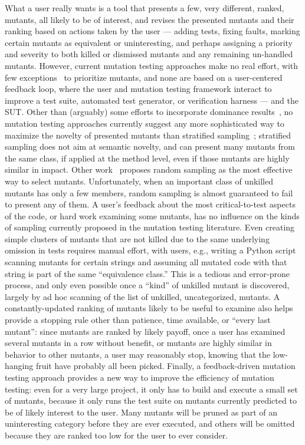 What a user really wants is a tool that presents a few, very different, ranked, mutants, all likely to be of interest, and revises the presented mutants and their ranking based on actions taken by the user --- adding tests, fixing faults, marking certain mutants as equivalent or uninteresting, and perhaps assigning a priority and severity to both killed or dismissed mutants and any remaining un-handled mutants. However, current mutation testing approaches make no real effort, with few exceptions~\cite{MutGoogle,FaRM} to prioritize mutants, and none are based on a user-centered feedback loop, where the user and mutation testing framework interact to improve a test suite, automated test generator, or verification harness --- and the SUT.  Other than (arguably) some efforts to incorporate dominance results~\cite{MutQuality}, no mutation testing approaches currently suggest any more sophisticated way to maximize the novelty of presented mutants than stratified sampling~\cite{gopinath2017mutation}; stratified sampling does not aim at semantic novelty, and can present many mutants from the same class, if applied at the method level, even if those mutants are highly similar in impact.  Other work~\cite{gopinath2015howhard} proposes random sampling as the most effective way to select mutants.  Unfortunately, when an important class of unkilled mutants has only a few members, random sampling is almost guaranteed to fail to present any of them.  A user's feedback about the most critical-to-test aspects of the code, or hard work examining some mutants, has no influence on the kinds of sampling currently proposed in the mutation testing literature.  Even creating simple clusters of mutants that are not killed due to the same underlying omission in tests requires manual effort, with users, e.g., writing a Python script scanning mutants for certain strings and assuming all mutated code with that string is part of the same ``equivalence class.''  This is a tedious and error-prone process, and only even possible once a ``kind'' of unkilled mutant is discovered, largely by ad hoc scanning of the list of unkilled, uncategorized, mutants.  A constantly-updated ranking of mutants likely to be useful to examine also helps provide a stopping rule other than patience, time available, or ``every last mutant'':  since mutants are ranked by likely payoff, once a user has examined several mutants in a row without benefit, or mutants are highly similar in behavior to other mutants, a user may reasonably stop, knowing that the low-hanging fruit have probably all been picked.  Finally, a feedback-driven mutation testing approach provides a new way to improve the efficiency of mutation testing:  even for a very large project, it only has to build and execute a small set of mutants, because it only runs the test suite on mutants currently predicted to be of likely interest to the user.  Many mutants will be pruned as part of an uninteresting category before they are ever executed, and others will be omitted because they are ranked too low for the user to ever consider.

